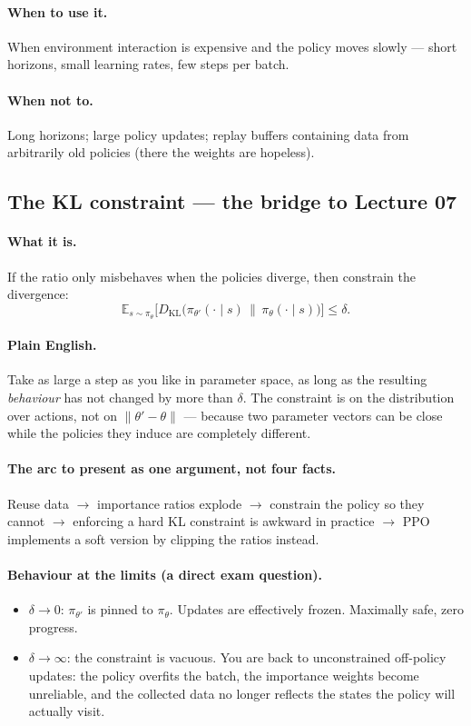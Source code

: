 \documentclass[11pt,a4paper]{article}
\begin{document}
\paragraph{When to use it.} When environment interaction is expensive and the
policy moves slowly --- short horizons, small learning rates, few steps per
batch.

\paragraph{When not to.} Long horizons; large policy updates; replay buffers
containing data from arbitrarily old policies (there the weights are hopeless).

\subsection{The KL constraint --- the bridge to Lecture 07}

\paragraph{What it is.} If the ratio only misbehaves when the policies diverge,
then constrain the divergence:
\[
\mathbb E_{s\sim\pi_\theta}\bigl[D_{\mathrm{KL}}\bigl(\pi_{\theta'}(\cdot\mid s)\,\|\,\pi_\theta(\cdot\mid s)\bigr)\bigr]\le \delta .
\]

\paragraph{Plain English.} Take as large a step as you like in parameter space,
as long as the resulting \emph{behaviour} has not changed by more than
$\delta$. The constraint is on the distribution over actions, not on
$\|\theta'-\theta\|$ --- because two parameter vectors can be close while the
policies they induce are completely different.

\paragraph{The arc to present as one argument, not four facts.} Reuse data
$\rightarrow$ importance ratios explode $\rightarrow$ constrain the policy so
they cannot $\rightarrow$ enforcing a hard KL constraint is awkward in practice
$\rightarrow$ PPO implements a soft version by clipping the ratios instead.

\paragraph{Behaviour at the limits (a direct exam question).}
\begin{itemize}
\item $\delta\to 0$: $\pi_{\theta'}$ is pinned to $\pi_\theta$. Updates are
effectively frozen. Maximally safe, zero progress.
\item $\delta\to\infty$: the constraint is vacuous. You are back to
unconstrained off-policy updates: the policy overfits the batch, the
importance weights become unreliable, and the collected data no longer
reflects the states the policy will actually visit.
\end{itemize}
\end{document}
